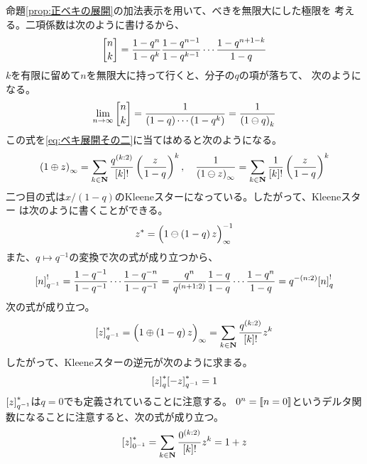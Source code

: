 {	命題\ref{prop:正ベキの展開}の加法表示を用いて、べきを無限大にした極限を
	考える。二項係数は次のように書けるから、
	\begin{equation*}\begin{split}
		\qbinom{n}{k} = \frac{1-q^n}{1-q^k}\frac{1-q^{n-1}}{1-q^{k-1}}
			\cdots\frac{1-q^{n+1-k}}{1-q}
	\end{split}\end{equation*}
	$k$を有限に留めて$n$を無限大に持って行くと、分子の$q$の項が落ちて、
	次のようになる。
	\begin{equation*}\begin{split}
		\lim_{n\to\infty}\qbinom{n}{k} = \frac{1}{\plr{1-q}\cdots\plr{1-q^k}}
		= \frac{1}{\plr{1\ominus q}_k}
	\end{split}\end{equation*}
	この式を\eqref{eq:ベキ展開その二}に当てはめると次のようになる。
	\begin{equation*}\begin{split}
		\mathinner{({1\oplus z})}_\infty = \sum_{k\in\mathbf{N}} \frac{q^{\mathinner{({k:2})}}}{{\mathinner{[{k}]}}!}
			\mathinner{\left({\frac{z}{1 - q}}\right)}^k,\quad
		\frac{1}{\mathinner{({1\ominus z})}_\infty} = \sum_{k\in\mathbf{N}} \frac{1}{{\mathinner{[{k}]}}!}
			\mathinner{\left({\frac{z}{1 - q}}\right)}^k
	\end{split}\end{equation*}
	二つ目の式は$x/(1-q)$のKleeneスターになっている。したがって、Kleeneスター
	は次のように書くことができる。
	\begin{equation*}\begin{split}
		z^* = \mathinner{\Bigl({1\ominus \mathinner{({1 - q})}z}\Bigr)}_\infty^{-1}
	\end{split}\end{equation*}
	また、$q\mapsto q^{-1}$の変換で次の式が成り立つから、
	\begin{equation*}\begin{split}
		{\mathinner{[{n}]}}_{q^{-1}}^! 
		= \frac{1 - q^{-1}}{1 - q^{-1}}\cdots\frac{1 - q^{-n}}{1 - q^{-1}}
		= \frac{q^n}{q^{\mathinner{({n+1:2})}}}\frac{1 - q}{1 - q}\cdots\frac{1 - q^n}{1 - q}
		= q^{-\mathinner{({n:2})}}{\mathinner{[{n}]}}_q^!
	\end{split}\end{equation*}
	次の式が成り立つ。
	\begin{equation*}\begin{split}
		{\mathinner{[{z}]}}_{q^{-1}}^* = \mathinner{\Bigl({1\oplus\mathinner{({1 - q})}z}\Bigr)}_\infty
		= \sum_{k\in\mathbf{N}} \frac{q^{\mathinner{({k:2})}}}{{\mathinner{[{k}]}}!}z^k
	\end{split}\end{equation*}
	したがって、Kleeneスターの逆元が次のように求まる。
	\begin{equation*}\begin{split}
		{\mathinner{[{z}]}}_q^*{\mathinner{[{-z}]}}_{q^{-1}}^* = 1
	\end{split}\end{equation*}
	${\mathinner{[{z}]}}_{q^{-1}}^*$は$q=0$でも定義されていることに注意する。
	$0^n=\mathinner{[\![n=0]\!]}$というデルタ関数になることに注意すると、次の式が成り立つ。
	\begin{equation*}\begin{split}
		{\mathinner{[{z}]}}_{0^{-1}}^* = \sum_{k\in\mathbf{N}} \frac{0^{\mathinner{({k:2})}}}{{\mathinner{[{k}]}}!}z^k
		= 1 + z
	\end{split}\end{equation*}

}

